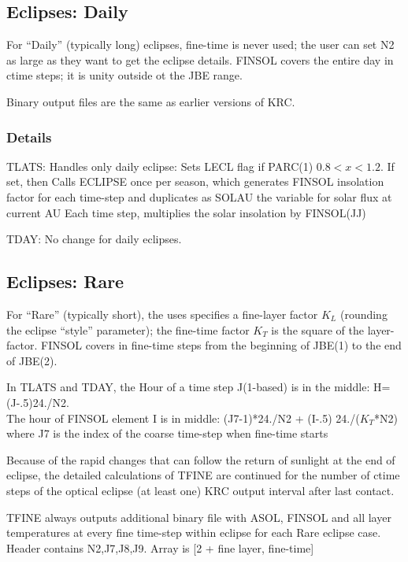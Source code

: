\documentclass{article}
\begin{document}
\subsection{Eclipses: Daily}

For ``Daily'' (typically long) eclipses, fine-time is never used; the user can
set N2 as large as they want to get the eclipse details. FINSOL covers the
entire day in ctime steps; it is unity outside ot the JBE range.

Binary output files are the same as earlier versions of KRC.

\subsubsection{Details} 

TLATS: Handles only daily eclipse: Sets LECL flag if PARC(1) $ 0.8 < x< 1.2 $. If set, then
\qi Calls ECLIPSE once per season, which generates FINSOL insolation factor for each time-step
\qii and duplicates as SOLAU the variable for solar flux at current AU
\qi Each time step, multiplies the solar insolation by FINSOL(JJ)

TDAY: No change for daily eclipses. 

\subsection{Eclipses: Rare}
For ``Rare'' (typically short), the uses specifies a fine-layer factor $K_L$
(rounding the eclipse ``style'' parameter); the fine-time factor $K_T$ is the
square of the layer-factor. FINSOL covers in fine-time steps from the beginning
of JBE(1) to the end of JBE(2).

In TLATS and TDAY, the Hour of a time step J(1-based) is in the middle:  H= (J-.5)24./N2. 
\\ The hour of FINSOL element I is in middle: (J7-1)*24./N2 + (I-.5) 24./($K_T$*N2)
\qi where J7 is the index of the coarse time-step  when fine-time starts 

Because of the rapid changes that can follow the return of sunlight at the end
of eclipse, the detailed calculations of TFINE are continued for the number of
ctime steps of the optical eclipse (at least one) KRC output interval after last
contact.

TFINE always outputs additional binary file  with ASOL, FINSOL
and all layer temperatures at every fine time-step within eclipse for each Rare
eclipse case. Header contains N2,J7,J8,J9.  Array is [2 + fine layer, fine-time] 
\end{document}
